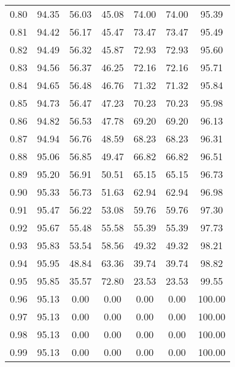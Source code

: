 \begin{tabular}{|c|c|c|c|c|c|c|}
      0.80 &     94.35 &     56.03 &      45.08 &   74.00 &      74.00 &         95.39 \\
      0.81 &     94.42 &     56.17 &      45.47 &   73.47 &      73.47 &         95.49 \\
      0.82 &     94.49 &     56.32 &      45.87 &   72.93 &      72.93 &         95.60 \\
      0.83 &     94.56 &     56.37 &      46.25 &   72.16 &      72.16 &         95.71 \\
      0.84 &     94.65 &     56.48 &      46.76 &   71.32 &      71.32 &         95.84 \\
      0.85 &     94.73 &     56.47 &      47.23 &   70.23 &      70.23 &         95.98 \\
      0.86 &     94.82 &     56.53 &      47.78 &   69.20 &      69.20 &         96.13 \\
      0.87 &     94.94 &     56.76 &      48.59 &   68.23 &      68.23 &         96.31 \\
      0.88 &     95.06 &     56.85 &      49.47 &   66.82 &      66.82 &         96.51 \\
      0.89 &     95.20 &     56.91 &      50.51 &   65.15 &      65.15 &         96.73 \\
      0.90 &     95.33 &     56.73 &      51.63 &   62.94 &      62.94 &         96.98 \\
      0.91 &     95.47 &     56.22 &      53.08 &   59.76 &      59.76 &         97.30 \\
      0.92 &     95.67 &     55.48 &      55.58 &   55.39 &      55.39 &         97.73 \\
      0.93 &     95.83 &     53.54 &      58.56 &   49.32 &      49.32 &         98.21 \\
      0.94 &     95.95 &     48.84 &      63.36 &   39.74 &      39.74 &         98.82 \\
      0.95 &     95.85 &     35.57 &      72.80 &   23.53 &      23.53 &         99.55 \\
      0.96 &     95.13 &      0.00 &       0.00 &    0.00 &       0.00 &        100.00 \\
      0.97 &     95.13 &      0.00 &       0.00 &    0.00 &       0.00 &        100.00 \\
      0.98 &     95.13 &      0.00 &       0.00 &    0.00 &       0.00 &        100.00 \\
      0.99 &     95.13 &      0.00 &       0.00 &    0.00 &       0.00 &        100.00 \\
\bottomrule
\end{tabular}
